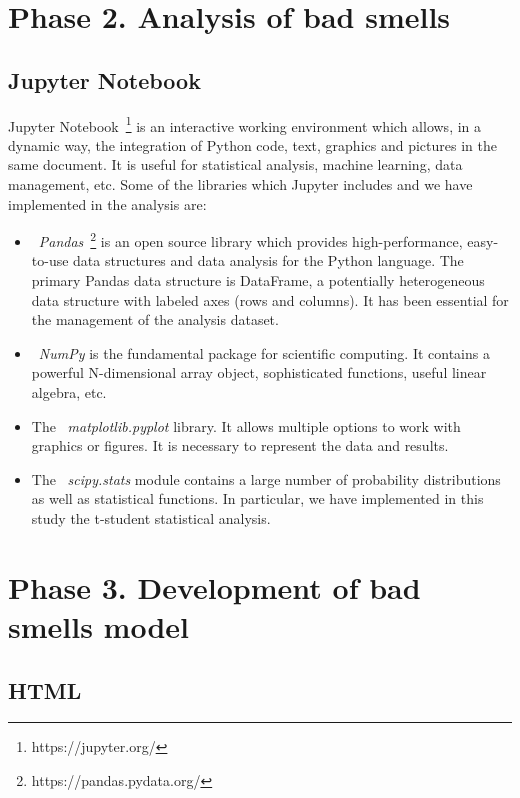 \section{Phase 2. Analysis of bad smells}
\label{sec:phase_2}

\subsection{Jupyter Notebook}
\label{subsec:jupyter}

Jupyter Notebook~\footnote{https://jupyter.org/} is an interactive working environment which allows, in a dynamic way, the integration of Python code, text, graphics and pictures in the same document. It is useful for statistical analysis, machine learning, data management, etc. Some of the libraries which Jupyter includes and we have implemented in the analysis are:

\begin{itemize}
    \item ~\textit{Pandas}~\footnote{https://pandas.pydata.org/} is an open source library which provides high-performance, easy-to-use data structures and data analysis for the Python language. The primary Pandas data structure is DataFrame, a potentially heterogeneous data structure with labeled axes (rows and columns). It has been essential for the management of the analysis dataset.
    \item ~\textit{NumPy} is the fundamental package for scientific computing. It contains a powerful N-dimensional array object, sophisticated functions, useful linear algebra, etc.
    \item The ~\textit{matplotlib.pyplot} library. It allows multiple options to work with graphics or figures. It is necessary to represent the data and results.
    \item The ~\textit{scipy.stats} module contains a large number of probability distributions as well as statistical functions. In particular, we have implemented in this study the t-student statistical analysis. 
\end{itemize}



\section{Phase 3. Development of bad smells model}
\label{sec:phase_3}

\subsection{HTML}
\label{subsec:html}


